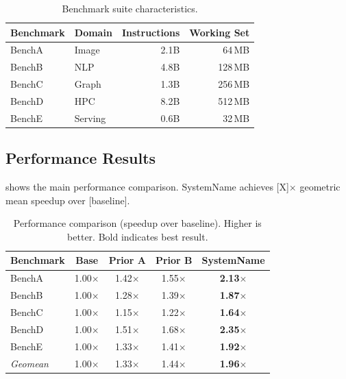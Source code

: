 \documentclass[sigplan,10pt]{acmart}
\newcommand{\system}{SystemName\xspace}
\begin{document}
\begin{table}[t]
  \caption{Benchmark suite characteristics.}
  \label{tab:benchmarks}
  \centering
  \begin{small}
  \begin{tabular}{@{}llrr@{}}
    \toprule
    \textbf{Benchmark} & \textbf{Domain} & \textbf{Instructions} &
    \textbf{Working Set} \\
    \midrule
    BenchA  & Image    & 2.1B  & 64\,MB  \\
    BenchB  & NLP      & 4.8B  & 128\,MB \\
    BenchC  & Graph    & 1.3B  & 256\,MB \\
    BenchD  & HPC      & 8.2B  & 512\,MB \\
    BenchE  & Serving  & 0.6B  & 32\,MB  \\
    \bottomrule
  \end{tabular}
  \end{small}
\end{table}

\subsection{Performance Results}
\label{sec:eval:perf}

 shows the main performance comparison.
\system achieves [X]$\times$ geometric mean speedup over [baseline].

\begin{table}[t]
  \caption{Performance comparison (speedup over baseline).
    Higher is better. Bold indicates best result.}
  \label{tab:performance}
  \centering
  \begin{small}
  \begin{tabular}{@{}lcccc@{}}
    \toprule
    \textbf{Benchmark} & \textbf{Base} & \textbf{Prior A} &
    \textbf{Prior B} & \textbf{\system} \\
    \midrule
    BenchA  & 1.00$\times$ & 1.42$\times$ & 1.55$\times$ & \textbf{2.13}$\times$ \\
    BenchB  & 1.00$\times$ & 1.28$\times$ & 1.39$\times$ & \textbf{1.87}$\times$ \\
    BenchC  & 1.00$\times$ & 1.15$\times$ & 1.22$\times$ & \textbf{1.64}$\times$ \\
    BenchD  & 1.00$\times$ & 1.51$\times$ & 1.68$\times$ & \textbf{2.35}$\times$ \\
    BenchE  & 1.00$\times$ & 1.33$\times$ & 1.41$\times$ & \textbf{1.92}$\times$ \\
    \midrule
    \textit{Geomean} & 1.00$\times$ & 1.33$\times$ & 1.44$\times$ &
    \textbf{1.96}$\times$ \\
    \bottomrule
  \end{tabular}
  \end{small}
\end{table}
\end{document}
